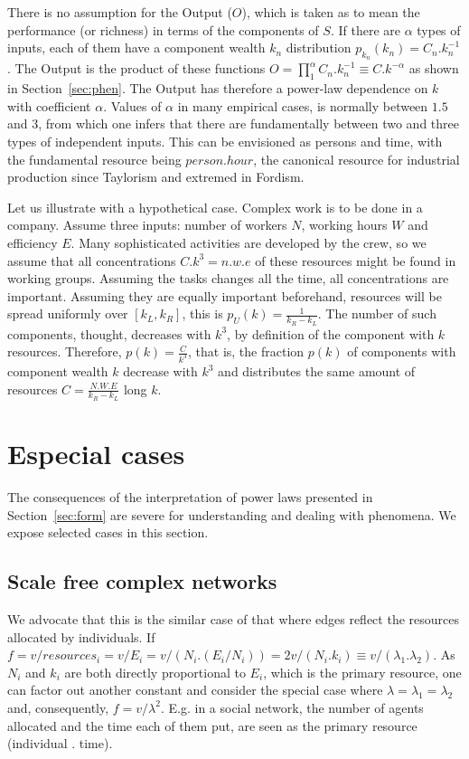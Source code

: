 \documentclass[a4paper, 11pt]{article} %
\begin{document}
There is no assumption for the Output ($O$), which is taken as to mean the performance (or richness) in terms of the components of $S$.
If there are $\alpha$ types of inputs,
each of them have a component wealth $k_n$ distribution
$p_{k_n}(k_n)=C_n.k_n^{-1}$.
The Output is the product of these functions
$O = \prod_1^{\alpha} C_n.k_n^{-1}\equiv C.k^{-\alpha}$
as shown in Section~\ref{sec:phen}. 
The Output has therefore a power-law dependence on $k$ with coefficient $\alpha$. 
Values of $\alpha$ in many empirical cases,
is normally between $1.5$ and $3$,
from which one infers that there are 
fundamentally between two and three types
of independent inputs.
This can be envisioned as persons and 
time, with the fundamental resource being 
$person . hour$, the canonical resource for 
industrial production since Taylorism
and extremed in Fordism.

Let us illustrate with a hypothetical case.
Complex work is to be done in a company.
Assume three inputs:
number of workers $N$, working hours $W$
and efficiency $E$.
Many sophisticated activities are developed by the crew,
so we assume that all concentrations $C.k^3=n.w.e$
of these resources might be found in working groups.
Assuming the tasks changes all the time,
all concentrations are important.
Assuming they are equally important beforehand,
resources will be spread uniformly over $[k_L,k_R]$,
this is $p_U(k)=\frac{1}{k_R-k_L}$.
The number of such components, thought,
decreases with $k^3$, by definition of the component
with $k$ resources.
Therefore, $p(k)=\frac{C}{k^3}$, that is,
the fraction $p(k)$ of components with component wealth $k$
decrease with $k^3$ and distributes the same
amount of resources $C=\frac{N.W.E}{k_R-k_L}$ long $k$.

\section{Especial cases}\label{sec:esp}
The consequences of the
interpretation of power laws presented in Section~\ref{sec:form}
are severe for understanding and dealing with
phenomena. We expose selected cases in this section.


\subsection{Scale free complex networks}
We advocate that this is the similar case of that where edges reflect the resources allocated by individuals. If $f=v/resources_i=v/E_i=v/(N_i . (E_i/N_i))=2v/(N_i . k_i) \equiv v / (\lambda_1 .   \lambda_2)$. As $N_i$ and $k_i$ are both directly proportional to $E_i$, which is the primary resource, one can factor out another constant and consider the special case where $\lambda=\lambda_1=\lambda_2$ and, consequently, $f=v/\lambda^2$. E.g. in a social network, the number of agents allocated and the time each of them put, are seen as the primary resource (individual . time).
\end{document}
